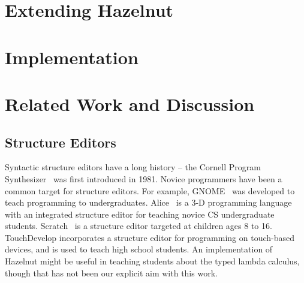 \documentclass[preprint,9pt]{sigplanconf}
\begin{document}


% 


\section{Extending Hazelnut}\label{sec:extending}


\section{Implementation}
\label{sec:impl}


\section{Related Work and Discussion}\label{sec:rw}
\subsection{Structure Editors}
Syntactic structure editors have a long history -- the Cornell Program Synthesizer~\cite{teitelbaum_cornell_1981} was first introduced in 1981. Novice programmers have been a common target for structure editors. For example, 
GNOME~\cite{garlan_gnome:_1984} was developed to teach programming to undergraduates. 
Alice~\cite{Conway:2000:ALL:332040.332481} is a 3-D programming language with an integrated structure editor for teaching novice CS undergraduate students. Scratch~\cite{Resnick:2009:SP:1592761.1592779} is a structure editor targeted at children ages 8 to 16.  TouchDevelop \cite{tillmann_touchdevelop:_2011} incorporates a structure editor for programming on touch-based devices, and is used to teach high school students. An implementation of Hazelnut might be useful in teaching students about the typed lambda calculus, though that has not been our explicit aim with this work.
\end{document}
